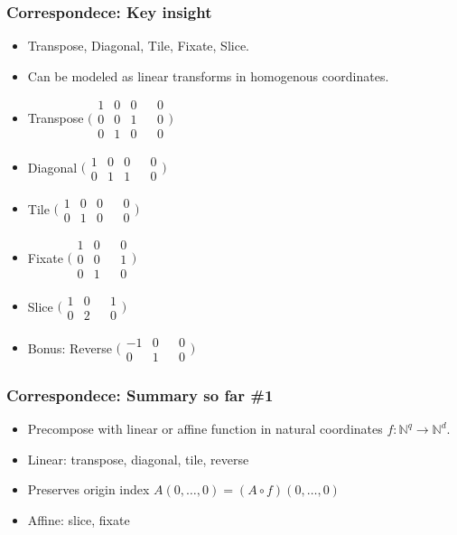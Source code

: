 \documentclass[xetex,mathserif,serif]{beamer}
\newcommand\Nat{\mathbb{N}}
\begin{document}
\begin{frame}
  \frametitle{Correspondece: Key insight}
  \begin{itemize}%
    \item Transpose, Diagonal, Tile, Fixate, Slice.
    \item Can be modeled as linear transforms in homogenous coordinates.
    \item Transpose \(\bigg(\begin{smallmatrix} 1 & 0 & 0 && 0 \\ 0 & 0 & 1 && 0 \\ 0 & 1 & 0 && 0 \end{smallmatrix}\bigg)\)
    \item Diagonal \(\big(\begin{smallmatrix} 1 & 0 & 0 && 0 \\ 0 & 1 & 1 && 0 \end{smallmatrix}\big)\)
    \item Tile \(\big(\begin{smallmatrix} 1 & 0 & 0 && 0 \\ 0 & 1 & 0 && 0 \end{smallmatrix}\big)\)
    \item Fixate \(\bigg(\begin{smallmatrix} 1 & 0 && 0 \\ 0 & 0 && 1 \\ 0 & 1 && 0 \end{smallmatrix}\bigg)\)
    \item Slice \(\big(\begin{smallmatrix} 1 & 0 && 1 \\ 0 & 2 && 0 \end{smallmatrix}\big)\)
    \item Bonus: Reverse \(\big(\begin{smallmatrix} -1 & 0 && 0 \\ 0 & 1 && 0 \end{smallmatrix}\big)\)
  \end{itemize}
\end{frame}

\begin{frame}
  \frametitle{Correspondece: Summary so far \#1}
  \begin{itemize}%
    \item Precompose with linear or affine function in natural coordinates \(f : \Nat^q \to \Nat^d\).
    \item Linear: transpose, diagonal, tile, reverse
    \item Preserves origin index \(A(0, \dots, 0) = (A \circ f)(0, \dots, 0)\)
    \item Affine: slice, fixate
  \end{itemize}
\end{frame}
\end{document}
